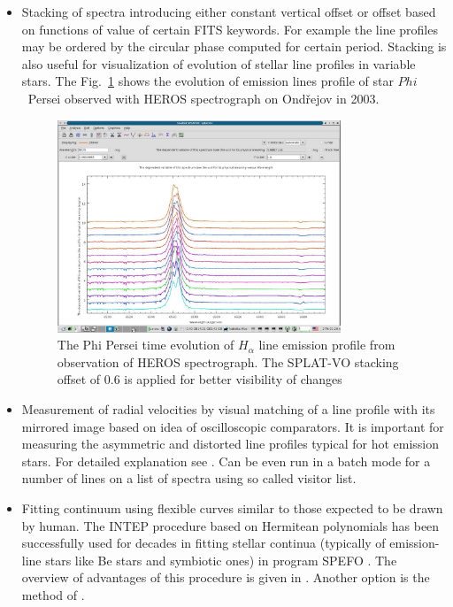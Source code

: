 \documentclass[final,authoryear,5p,times,twocolumn]{elsarticle}
\begin{document}
\begin{itemize}

\item Stacking of spectra introducing either constant vertical offset or
offset based on functions of value of certain FITS keywords. For example the
line profiles may be ordered by the circular phase computed for certain
period. Stacking is also useful for visualization of evolution of stellar line profiles in variable stars.
The Fig.~\ref{fig:phiper-heros-stack} shows the evolution of emission lines profile of star $Phi$~Persei observed with HEROS spectrograph on Ond\v{r}ejov in 2003.

\begin{figure}[t]
\begin{center}
\includegraphics[width=0.8\textwidth]{phiper-heros-stack.pdf}
\caption{The Phi Persei time evolution of $H_\alpha$ line emission profile from observation of HEROS spectrograph. The SPLAT-VO stacking offset of  0.6 is applied for better visibility of changes}
\label{fig:phiper-heros-stack}
\end{center}
\end{figure}




\item Measurement of radial velocities by visual matching of a line profile
with its mirrored image based on idea of oscilloscopic comparators. It is
important for measuring the asymmetric and distorted line profiles typical for
hot emission stars. For detailed explanation see \citet{2007IAUS..240..486P}.
Can be even run in a batch mode for a number of lines on a list of spectra
using so called visitor list.

\item Fitting continuum using flexible curves similar to those expected to be
drawn by human.  The  INTEP procedure based on Hermitean polynomials
\citep{1982PDAO...16...67H} has been successfully used for decades in fitting stellar
continua (typically of emission-line stars like Be stars and symbiotic ones)
in program SPEFO \citep{1996ASPC..101..187S}. The overview of advantages of
this procedure is given in \citet{2008asvo.proc...97S}. Another option is the
method of \citet{Akima:1970:NMI:321607.321609}.


\end{itemize}
\end{document}
